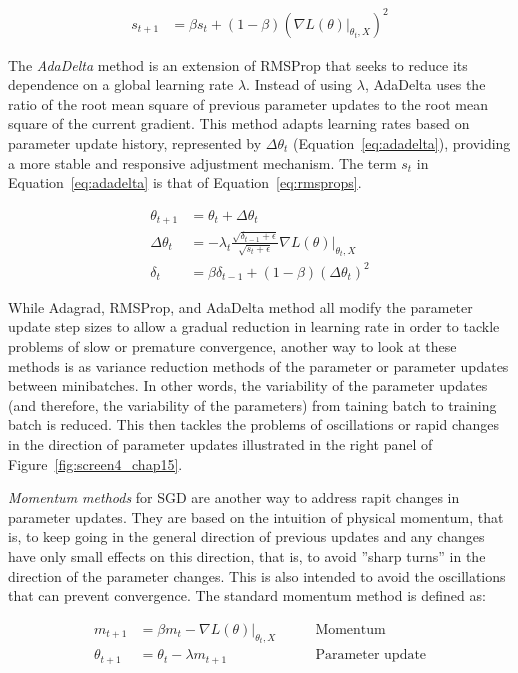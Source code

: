 \begin{align}
s_{t+1} &= \beta s_t + (1-\beta) \left( \nabla L(\theta)\rvert_{\theta_t, X}\right)^2 \label{eq:rmsprops}
\end{align}

The \emph{AdaDelta} method is an extension of RMSProp that seeks to reduce its dependence on a global learning rate $\lambda$. Instead of using $\lambda$, AdaDelta uses the ratio of the root mean square of previous parameter updates to the root mean square of the current gradient. This method adapts learning rates based on parameter update history, represented by $\Delta\theta_t$ (Equation~\ref{eq:adadelta}), providing a more stable and responsive adjustment mechanism. The term $s_t$ in Equation~\ref{eq:adadelta} is that of Equation~\ref{eq:rmsprops}.

\begin{align}
\theta_{t+1} &= \theta_t + \Delta\theta_t \nonumber \\
\Delta\theta_{t} &= - \lambda_t \frac{\sqrt{\delta_{t-1} + \epsilon}}{\sqrt{s_t + \epsilon}} \nabla L(\theta) \rvert_{\theta_t, X} \label{eq:adadelta} \\
\delta_t &= \beta \delta_{t-1} + (1-\beta) (\Delta\theta_t)^2 \nonumber
\end{align}

While Adagrad, RMSProp, and AdaDelta method all modify the parameter update step sizes to allow a gradual reduction in learning rate in order to tackle problems of slow or premature convergence, another way to look at these methods is as variance reduction methods of the parameter or parameter updates between minibatches. In other words, the variability of the parameter updates (and therefore, the variability of the parameters) from taining batch to training batch is reduced. This then tackles the problems of oscillations or rapid changes in the direction of parameter updates illustrated in the right panel of Figure~\ref{fig:screen4_chap15}.

\emph{Momentum methods} for SGD are another way to address rapit changes in parameter updates. They are based on the intuition of physical momentum, that is, to keep going in the general direction of previous updates and any changes have only small effects on this direction, that is, to avoid ''sharp turns'' in the direction of the parameter changes. This is also intended to avoid the oscillations that can prevent convergence. The standard momentum method is defined as:

\begin{align*}
m_{t+1} &= \beta m_{t} - \nabla L(\theta) \rvert_{\theta_t, X} &\qquad \text{Momentum} \\
\theta_{t+1} &= \theta_{t} - \lambda m_{t+1} &\qquad \text{Parameter update} \\
\end{align*}

